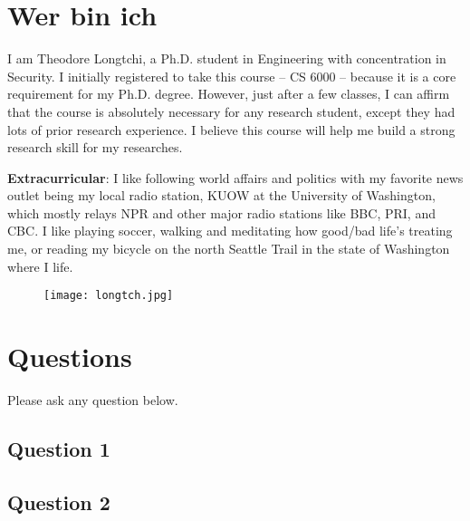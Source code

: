 \documentclass{IEEEtran}
\begin{document}
\section{Wer bin ich}
I am Theodore Longtchi, a Ph.D. student in Engineering with concentration in Security. I initially registered to take this course – CS 6000 – because it is a core requirement for my Ph.D. degree. However, just after a few classes, I can affirm that the course is absolutely necessary for any research student, except they had lots of prior research experience. I believe this course will help me build a strong research skill for my researches.

\textbf{Extracurricular}: I like following world affairs and politics with my favorite news outlet being my local radio station, KUOW at the University of Washington, which mostly relays NPR and other major radio stations like BBC, PRI, and CBC. I like playing soccer, walking and meditating how good/bad life's treating me, or reading my bicycle on the north Seattle Trail in the state of Washington where I life.

\begin{figure}[ht!]
\centering
\texttt{[image: longtch.jpg]}
\end{figure}

\section{Questions}
Please ask any question below.

\subsection{Question 1}


\subsection{Question 2}
\end{document}

